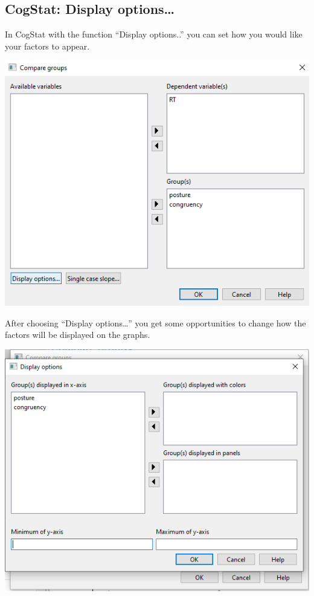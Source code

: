 \documentclass[
]{book}
\begin{document}
\hypertarget{cogstat-display-options}{%
\subsection{CogStat: Display options\ldots{}}\label{cogstat-display-options}}

In CogStat with the function ``Display options..'' you can set how you would like your factors to appear.

\includegraphics{img/ch10/10.4CGwindow_displayop.png}

After choosing ``Display options\ldots{}'' you get some opportunities to change how the factors will be displayed on the graphs.

\includegraphics{img/ch10/10.4displayoption_window.png}
\end{document}
